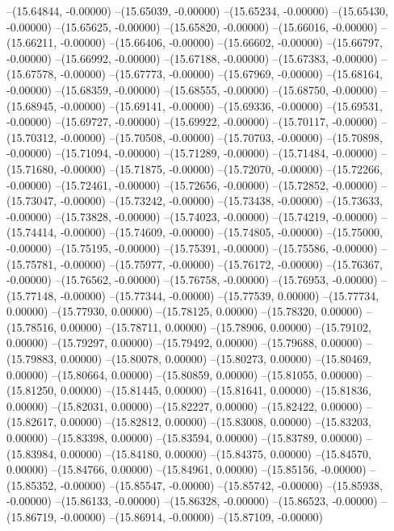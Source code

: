 --(15.64844, -0.00000)
--(15.65039, -0.00000)
--(15.65234, -0.00000)
--(15.65430, -0.00000)
--(15.65625, -0.00000)
--(15.65820, -0.00000)
--(15.66016, -0.00000)
--(15.66211, -0.00000)
--(15.66406, -0.00000)
--(15.66602, -0.00000)
--(15.66797, -0.00000)
--(15.66992, -0.00000)
--(15.67188, -0.00000)
--(15.67383, -0.00000)
--(15.67578, -0.00000)
--(15.67773, -0.00000)
--(15.67969, -0.00000)
--(15.68164, -0.00000)
--(15.68359, -0.00000)
--(15.68555, -0.00000)
--(15.68750, -0.00000)
--(15.68945, -0.00000)
--(15.69141, -0.00000)
--(15.69336, -0.00000)
--(15.69531, -0.00000)
--(15.69727, -0.00000)
--(15.69922, -0.00000)
--(15.70117, -0.00000)
--(15.70312, -0.00000)
--(15.70508, -0.00000)
--(15.70703, -0.00000)
--(15.70898, -0.00000)
--(15.71094, -0.00000)
--(15.71289, -0.00000)
--(15.71484, -0.00000)
--(15.71680, -0.00000)
--(15.71875, -0.00000)
--(15.72070, -0.00000)
--(15.72266, -0.00000)
--(15.72461, -0.00000)
--(15.72656, -0.00000)
--(15.72852, -0.00000)
--(15.73047, -0.00000)
--(15.73242, -0.00000)
--(15.73438, -0.00000)
--(15.73633, -0.00000)
--(15.73828, -0.00000)
--(15.74023, -0.00000)
--(15.74219, -0.00000)
--(15.74414, -0.00000)
--(15.74609, -0.00000)
--(15.74805, -0.00000)
--(15.75000, -0.00000)
--(15.75195, -0.00000)
--(15.75391, -0.00000)
--(15.75586, -0.00000)
--(15.75781, -0.00000)
--(15.75977, -0.00000)
--(15.76172, -0.00000)
--(15.76367, -0.00000)
--(15.76562, -0.00000)
--(15.76758, -0.00000)
--(15.76953, -0.00000)
--(15.77148, -0.00000)
--(15.77344, -0.00000)
--(15.77539, 0.00000)
--(15.77734, 0.00000)
--(15.77930, 0.00000)
--(15.78125, 0.00000)
--(15.78320, 0.00000)
--(15.78516, 0.00000)
--(15.78711, 0.00000)
--(15.78906, 0.00000)
--(15.79102, 0.00000)
--(15.79297, 0.00000)
--(15.79492, 0.00000)
--(15.79688, 0.00000)
--(15.79883, 0.00000)
--(15.80078, 0.00000)
--(15.80273, 0.00000)
--(15.80469, 0.00000)
--(15.80664, 0.00000)
--(15.80859, 0.00000)
--(15.81055, 0.00000)
--(15.81250, 0.00000)
--(15.81445, 0.00000)
--(15.81641, 0.00000)
--(15.81836, 0.00000)
--(15.82031, 0.00000)
--(15.82227, 0.00000)
--(15.82422, 0.00000)
--(15.82617, 0.00000)
--(15.82812, 0.00000)
--(15.83008, 0.00000)
--(15.83203, 0.00000)
--(15.83398, 0.00000)
--(15.83594, 0.00000)
--(15.83789, 0.00000)
--(15.83984, 0.00000)
--(15.84180, 0.00000)
--(15.84375, 0.00000)
--(15.84570, 0.00000)
--(15.84766, 0.00000)
--(15.84961, 0.00000)
--(15.85156, -0.00000)
--(15.85352, -0.00000)
--(15.85547, -0.00000)
--(15.85742, -0.00000)
--(15.85938, -0.00000)
--(15.86133, -0.00000)
--(15.86328, -0.00000)
--(15.86523, -0.00000)
--(15.86719, -0.00000)
--(15.86914, -0.00000)
--(15.87109, -0.00000)
